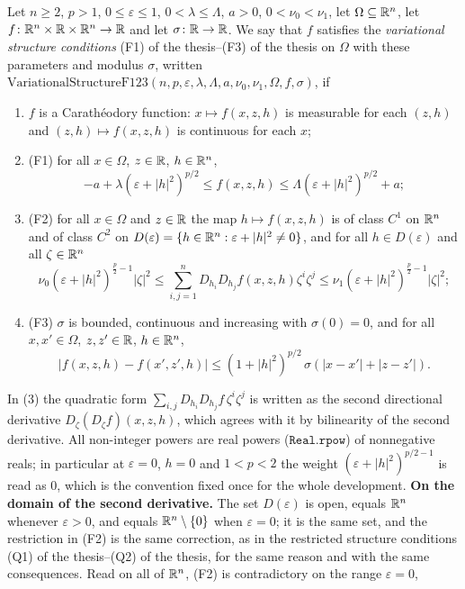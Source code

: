 \begin{definition}
Let $n\ge2$, $p>1$, $0\le\varepsilon\le1$, $0<\lambda\le\Lambda$, $a>0$,
$0<\nu_0<\nu_1$, let $\Omega\subseteq\mathbb{R}^n$, let
$f\colon\mathbb{R}^n\times\mathbb{R}\times\mathbb{R}^n\to\mathbb{R}$ and let $\sigma\colon\mathbb{R}\to\mathbb{R}$.  We say
that $f$ satisfies the \emph{variational structure conditions}
(F1) of the thesis--(F3) of the thesis on $\Omega$ with these parameters and modulus
$\sigma$, written
$\mathrm{VariationalStructureF123}(n,p,\varepsilon,\lambda,\Lambda,a,\nu_0,\nu_1,\Omega,f,\sigma)$,
if
\begin{enumerate}
\item $f$ is a Carath\'eodory function: $x\mapsto f(x,z,h)$ is measurable for
  each $(z,h)$ and $(z,h)\mapsto f(x,z,h)$ is continuous for each $x$;
\item (F1) for all $x\in\Omega$, $z\in\mathbb{R}$, $h\in\mathbb{R}^n$,
\[
-a+\lambda(\varepsilon+|h|^2)^{p/2}\le f(x,z,h)\le\Lambda(\varepsilon+|h|^2)^{p/2}+a;
\]
\item (F2) for all $x\in\Omega$ and $z\in\mathbb{R}$ the map $h\mapsto f(x,z,h)$ is
  of class $C^1$ on $\mathbb{R}^n$ and of class $C^2$ on
  $D(\varepsilon)=\{h\in\mathbb{R}^n:\varepsilon+|h|^2\ne0\}$, and for all
  $h\in D(\varepsilon)$ and all $\zeta\in\mathbb{R}^n$
\[
\nu_0(\varepsilon+|h|^2)^{\frac p2-1}|\zeta|^2
\le\sum_{i,j=1}^nD_{h_i}D_{h_j}f(x,z,h)\zeta^i\zeta^j
\le\nu_1(\varepsilon+|h|^2)^{\frac p2-1}|\zeta|^2;
\]
\item (F3) $\sigma$ is bounded, continuous and increasing with $\sigma(0)=0$,
  and for all $x,x'\in\Omega$, $z,z'\in\mathbb{R}$, $h\in\mathbb{R}^n$,
\[
|f(x,z,h)-f(x',z',h)|\le(1+|h|^2)^{p/2}\,\sigma(|x-x'|+|z-z'|).
\]
\end{enumerate}
In (3) the quadratic form $\sum_{i,j}D_{h_i}D_{h_j}f\,\zeta^i\zeta^j$ is written
as the second directional derivative
$D_\zeta(D_\zeta f)(x,z,h)$, which agrees with it by bilinearity of the second
derivative.  All non-integer powers are real powers ($\mathtt{Real.rpow}$) of
nonnegative reals; in particular at $\varepsilon=0$, $h=0$ and $1<p<2$ the weight
$(\varepsilon+|h|^2)^{p/2-1}$ is read as $0$, which is the convention fixed once
for the whole development.
\textbf{On the domain of the second derivative.}  The set $D(\varepsilon)$ is
open, equals $\mathbb{R}^n$ whenever $\varepsilon>0$, and equals $\mathbb{R}^n\setminus\{0\}$
when $\varepsilon=0$; it is the same set, and the restriction in (F2) is the same
correction, as in the restricted structure conditions
(Q1) of the thesis--(Q2) of the thesis, for the same reason and with the same consequences.
Read on all of $\mathbb{R}^n$, (F2) is contradictory on the range $\varepsilon=0$,

\end{definition}
